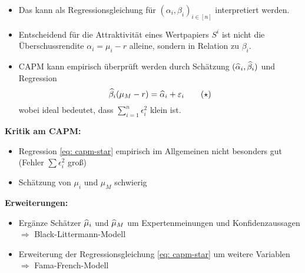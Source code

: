 \begin{itemize}
	\begin{itemize}[nolistsep]
		\item Das kann als Regressionsgleichung für $(\alpha_i, \beta_i)_{i \in [n]}$ interpretiert werden.
		\item  Entscheidend für die Attraktivität eines Wertpapiers $S^i$ ist nicht die Überschussrendite $\alpha_i = \mu_i - r$ alleine, sondern in Relation zu $\beta_i$.
		\item CAPM kann empirisch überprüft werden durch Schätzung $(\widehat{\alpha}_i, \widehat{\beta}_i)$ und Regression
		\begin{equation*}
			\widehat{\beta}_i (\mu_M - r) = \widehat{\alpha}_i + \varepsilon_i
			\tag{$\star$} \label{eq: capm-star}
		\end{equation*}
		wobei ideal bedeutet, dass $\sum_{i=1}^n \epsilon_i^2$ klein ist.
	\end{itemize}
\end{itemize}

\textbf{Kritik am CAPM:}
\begin{itemize}[nolistsep, topsep=-\parskip]
	\item Regression \eqref{eq: capm-star} empirisch im Allgemeinen nicht besonders gut (Fehler $\sum \epsilon_i^2$ groß)
	\item Schätzung von $\mu_i$ und $\mu_M$ schwierig
\end{itemize}

\vspace{\parskip}

\textbf{Erweiterungen:}
\begin{itemize}[nolistsep, topsep=-\parskip]
	\item Ergänze Schätzer $\widehat{\mu}_i$ und $\widehat{\mu}_M$ um Expertenmeinungen und Konfidenzaussagen \\
	$\Rightarrow$ Black-Littermann-Modell
	\item Erweiterung der Regressionsgleichung \eqref{eq: capm-star} um weitere Variablen \\
	$\Rightarrow$ Fama-French-Modell
\end{itemize}